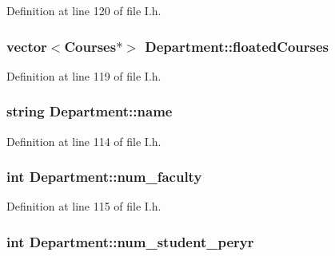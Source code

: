 \-Definition at line 120 of file \-I.\-h.

\hypertarget{structDepartment_a64395589d713e7b8d393e1b019605398}{
\subsubsection[{floated\-Courses}]{\setlength{\rightskip}{0pt plus 5cm}vector$<${\bf \-Courses}$\ast$$>$ {\bf \-Department\-::floated\-Courses}}}\label{structDepartment_a64395589d713e7b8d393e1b019605398}


\-Definition at line 119 of file \-I.\-h.

\hypertarget{structDepartment_a914dfcfd923227e55273099dc59e3aff}{
\subsubsection[{name}]{\setlength{\rightskip}{0pt plus 5cm}string {\bf \-Department\-::name}}}\label{structDepartment_a914dfcfd923227e55273099dc59e3aff}


\-Definition at line 114 of file \-I.\-h.

\hypertarget{structDepartment_a409838c12b0294696b50752e40885344}{
\subsubsection[{num\-\_\-faculty}]{\setlength{\rightskip}{0pt plus 5cm}int {\bf \-Department\-::num\-\_\-faculty}}}\label{structDepartment_a409838c12b0294696b50752e40885344}


\-Definition at line 115 of file \-I.\-h.

\hypertarget{structDepartment_aa2c741b2ea49f5f062a58ec91e53e1cb}{
\subsubsection[{num\-\_\-student\-\_\-peryr}]{\setlength{\rightskip}{0pt plus 5cm}int {\bf \-Department\-::num\-\_\-student\-\_\-peryr}}}\label{structDepartment_aa2c741b2ea49f5f062a58ec91e53e1cb}


